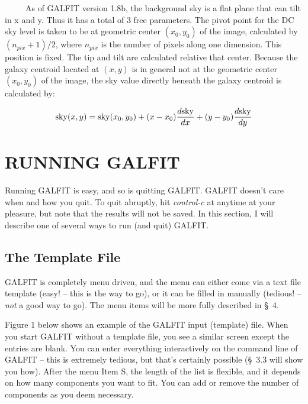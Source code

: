 \documentclass[preprint]{aastex}
\begin{document}
\bigskip

\ \ \ \ \ As of GALFIT version 1.8b, the
background sky is a flat plane that can tilt in x and y.  Thus it has a total
of 3 free parameters.  The pivot point for the DC sky level is taken to be at
geometric center $(x_0, y_0)$ of the image, calculated by $(n_{pix} + 1)/2$,
where $n_{pix}$ is the number of pixels along one dimension.  This position is
fixed.  The tip and tilt are calculated relative that center.  Because the
galaxy centroid located at $(x,y)$ is in general not at the geometric center
$(x_0, y_0)$ of the image, the sky value directly beneath the galaxy centroid
is calculated by:

\begin {equation}
    {\rm sky}(x,y) = {\rm sky} (x_0,y_0) + (x - x_0){{d\rm sky}\over{dx}} + (y - y_0) {{d\rm sky}\over{dy}}
\end {equation}

\bigskip

\section {RUNNING GALFIT}

Running GALFIT is easy, and so is quitting GALFIT.  GALFIT doesn't care when
and how you quit.  To quit abruptly, hit {\it control-c} at anytime at your
pleasure, but note that the results will not be saved.  In this section, I
will describe one of several ways to run (and quit) GALFIT.

\subsection {The Template File}

GALFIT is completely menu driven, and the menu can either come via a text file
template (easy! -- this is the way to go), or it can be filled in manually
(tedious! -- {\it not} a good way to go).  The menu items will be more
fully described in \S~4.

Figure 1 below shows an example of the GALFIT input (template) file.  When you
start GALFIT without a template file, you see a similar screen except the
entries are blank.  You can enter everything interactively on the command line
of GALFIT -- this is extremely tedious, but that's certainly possible (\S~3.3
will show you how).  After the menu Item S, the length of the list is
flexible, and it depends on how many components you want to fit.  You can add
or remove the number of components as you deem necessary.
\end{document}
